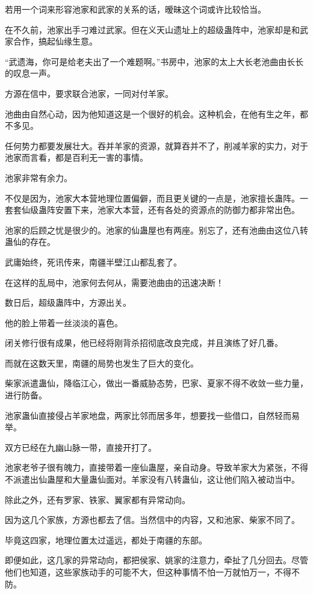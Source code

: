 \begin{this_body}
若用一个词来形容池家和武家的关系的话，暧昧这个词或许比较恰当。

在不久前，池家出手刁难过武家。但在义天山遗址上的超级蛊阵中，池家却是和武家合作，搞起仙缘生意。

“武遗海，你可是给老夫出了一个难题啊。”书房中，池家的太上大长老池曲由长长的叹息一声。

方源在信中，要求联合池家，一同对付羊家。

池曲由自然心动，因为他知道这是一个很好的机会。这种机会，在他有生之年，都不多见。

任何势力都要发展壮大。吞并羊家的资源，就算吞并不了，削减羊家的实力，对于池家而言看，都是百利无一害的事情。

池家非常有余力。

不仅是因为，池家大本营地理位置偏僻，而且更关键的一点是，池家擅长蛊阵。一套套仙级蛊阵安置下来，池家大本营，还有各处的资源点的防御力都非常出色。

池家的后顾之忧是很少的。池家的仙蛊屋也有两座。别忘了，还有池曲由这位八转蛊仙的存在。

武庸始终，死讯传来，南疆半壁江山都乱套了。

在这样的乱局中，池家何去何从，需要池曲由的迅速决断！

数日后，超级蛊阵中，方源出关。

他的脸上带着一丝淡淡的喜色。

闭关修行很有成果，他已经将刚背杀招彻底改良完成，并且演练了好几番。

而就在这数天里，南疆的局势也发生了巨大的变化。

柴家派遣蛊仙，降临江心，做出一番威胁态势，巴家、夏家不得不收敛一些力量，进行防备。

池家蛊仙直接侵占羊家地盘，两家比邻而居多年，想要找一些借口，自然轻而易举。

双方已经在九幽山脉一带，直接开打了。

池家老爷子很有魄力，直接带着一座仙蛊屋，亲自动身。导致羊家大为紧张，不得不派遣出仙蛊屋和大量蛊仙面对。羊家没有八转蛊仙，这让他们陷入被动当中。

除此之外，还有罗家、铁家、翼家都有异常动向。

因为这几个家族，方源也都去了信。当然信中的内容，又和池家、柴家不同了。

毕竟这四家，地理位置太过遥远，都处于南疆的东部。

即便如此，这几家的异常动向，都把侯家、姚家的注意力，牵扯了几分回去。尽管他们也知道，这些家族动手的可能不大，但这种事情不怕一万就怕万一，不得不防。


\end{this_body}
